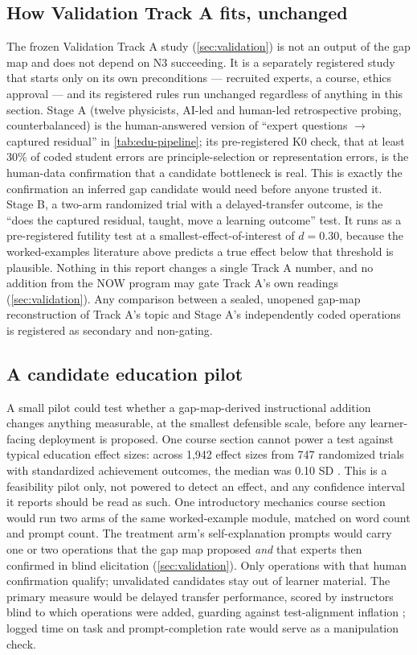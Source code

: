 \subsection{How Validation Track A fits, unchanged}
\label{sec:education-tracka}

The frozen Validation Track A study (\cref{sec:validation}) is not an output of the gap map and
does not depend on N3 succeeding. It is a separately registered study that starts only on its own
preconditions --- recruited experts, a course, ethics approval --- and its registered rules run
unchanged regardless of anything in this section. Stage A (twelve physicists, AI-led and
human-led retrospective probing, counterbalanced) is the human-answered version of ``expert
questions $\to$ captured residual'' in \cref{tab:edu-pipeline}; its pre-registered K0 check, that
at least 30\% of coded student errors are principle-selection or representation errors, is the
human-data confirmation that a candidate bottleneck is real. This is exactly the confirmation an
inferred gap candidate would need before anyone trusted it. Stage B, a two-arm randomized trial
with a delayed-transfer outcome, is the ``does the captured residual, taught, move a learning
outcome'' test. It runs as a pre-registered futility test at a smallest-effect-of-interest of
$d = 0.30$, because the worked-examples literature above predicts a true effect below that
threshold is plausible. Nothing in this report changes a single Track A number, and no addition
from the NOW program may gate Track A's own readings (\cref{sec:validation}). Any comparison
between a sealed, unopened gap-map reconstruction of Track A's topic and Stage A's independently
coded operations is registered as secondary and non-gating.

\subsection{A candidate education pilot}
\label{sec:education-pilot}

A small pilot could test whether a gap-map-derived instructional addition changes anything
measurable, at the smallest defensible scale, before any learner-facing deployment is proposed.
One course section cannot power a test against typical education effect sizes: across 1{,}942
effect sizes from 747 randomized trials with standardized achievement outcomes, the median was
0.10 SD \parencite{kraft2020interpreting}. This is a feasibility pilot only, not powered to detect an
effect, and any confidence interval it reports should be read as such. One introductory mechanics
course section would run two arms of the same worked-example module,
matched on word count and prompt count. The treatment arm's self-explanation prompts would carry
one or two operations that the gap map proposed \emph{and} that experts then confirmed in blind
elicitation (\cref{sec:validation}). Only operations with that human confirmation qualify;
unvalidated candidates stay out of learner material. The primary measure would be delayed transfer performance, scored by
instructors blind to which operations were added, guarding against test-alignment inflation
\parencite{kulik2016effectiveness}; logged time on task and prompt-completion rate would serve as a
manipulation check.

